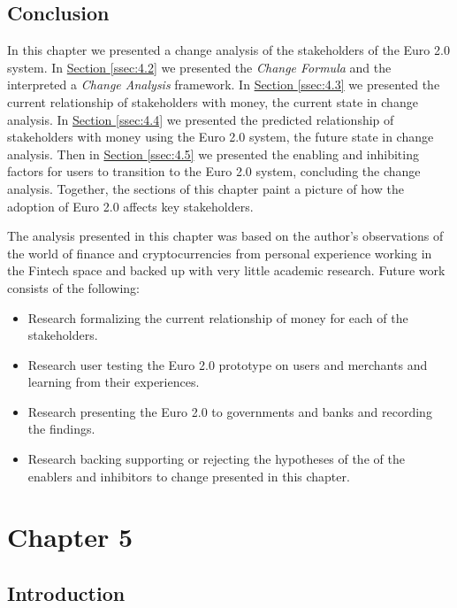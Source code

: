 \documentclass[a4paper,12pt]{article} %
\newcommand{\hypersectionref}[1]{\hyperref[#1]{Section \ref{#1}}}
\begin{document}
{\subsection{Conclusion} \label{ssec:4.6}

In this chapter we presented a change analysis of the stakeholders of the Euro 2.0 system. In \hypersectionref{ssec:4.2} we presented the \textit{Change Formula} and the interpreted a \textit{Change Analysis} framework. In \hypersectionref{ssec:4.3} we presented the  current relationship of stakeholders with money, the current state in change analysis. In \hypersectionref{ssec:4.4} we presented the  predicted relationship of stakeholders with money using the Euro 2.0 system, the future state in change analysis. Then in \hypersectionref{ssec:4.5} we presented the enabling and inhibiting factors for users to transition to the Euro 2.0 system, concluding the change analysis. Together, the sections of this chapter paint a picture of how the adoption of Euro 2.0 affects key stakeholders.

The analysis presented in this chapter was based on the author's observations of the world of finance and cryptocurrencies from personal experience working in the Fintech space and backed up with very little academic research. Future work consists of the following:

\begin{itemize}
	\item Research formalizing the current relationship of money for each of the stakeholders.
	\item Research user testing the Euro 2.0 prototype on users and merchants and learning from their experiences.
	\item Research presenting the Euro 2.0 to governments and banks and recording the findings.
	\item Research backing supporting or rejecting the hypotheses of the of the enablers and inhibitors to change presented in this chapter.
\end{itemize}

\pagebreak

\section{Chapter 5} \label{sec:5}

\subsection{Introduction} \label{ssec:5:intro}

}
\end{document}
